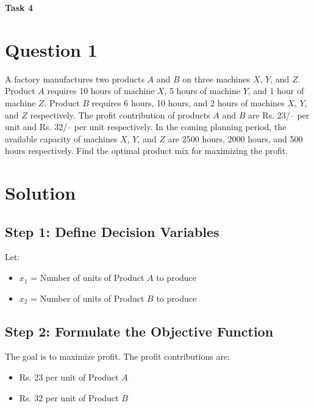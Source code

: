 \documentclass{article}
\begin{document}
\begin{center}
    \vspace*{\fill}  %
    {\LARGE \textbf{Task 4}}
    \vspace*{\fill}
\end{center}

\newpage  %

\section*{Question 1}
A factory manufactures two products \( A \) and \( B \) on three machines \( X \), \( Y \), and \( Z \). Product \( A \) requires 10 hours of machine \( X \), 5 hours of machine \( Y \), and 1 hour of machine \( Z \). Product \( B \) requires 6 hours, 10 hours, and 2 hours of machines \( X \), \( Y \), and \( Z \) respectively. The profit contribution of products \( A \) and \( B \) are Rs. 23/– per unit and Rs. 32/– per unit respectively. In the coming planning period, the available capacity of machines \( X \), \( Y \), and \( Z \) are 2500 hours, 2000 hours, and 500 hours respectively. Find the optimal product mix for maximizing the profit.

\section*{Solution}

\subsection*{Step 1: Define Decision Variables}
Let:
\begin{itemize}
    \item \( x_1 \) = Number of units of Product \( A \) to produce
    \item \( x_2 \) = Number of units of Product \( B \) to produce
\end{itemize}

\subsection*{Step 2: Formulate the Objective Function}
The goal is to maximize profit. The profit contributions are:
\begin{itemize}
    \item Rs. 23 per unit of Product \( A \)
    \item Rs. 32 per unit of Product \( B \)
\end{itemize}
\end{document}
